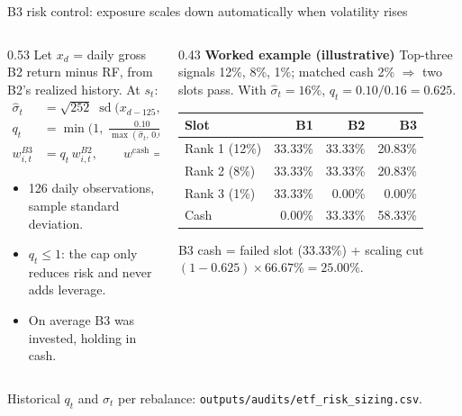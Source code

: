 \documentclass[aspectratio=169,11pt]{beamer}
\newcommand{\src}[1]{\par\vfill{\scriptsize\color{muted}\sloppy #1\par}\vskip0.05cm}
\begin{document}
\begin{frame}[t]{B3 risk control: exposure scales down automatically when volatility rises}
\begin{columns}[T,onlytextwidth]
\begin{column}{0.53\textwidth}
\small
Let $x_d$ = daily gross B2 return minus RF, from B2's realized history. At $s_t$:
\begin{align*}
\hat\sigma_t &= \sqrt{252}\;\operatorname{sd}\big(x_{d-125},\dots,x_{d}\big),\quad d=s_t,\\
q_t &= \min\!\Big(1,\;\frac{0.10}{\max(\hat\sigma_t,\,0.05)}\Big),\\
w^{B3}_{i,t} &= q_t\,w^{B2}_{i,t},\qquad w^{\text{cash}} = 1-q_t\textstyle\sum_i w^{B2}_{i,t}.
\end{align*}
\footnotesize
\begin{itemize}\itemsep2pt
\item 126 daily observations, sample standard deviation.
\item $q_t\le 1$: the cap only reduces risk and never adds leverage.
\item On average B3 was \BthreeInvested{} invested, holding \BthreeCash{} in cash.
\end{itemize}
\end{column}
\begin{column}{0.43\textwidth}
\footnotesize
\textbf{Worked example (illustrative)}
\vskip0.1cm
Top-three signals 12\%, 8\%, 1\%; matched cash 2\% $\Rightarrow$ two slots pass. With $\hat\sigma_t=16\%$, $q_t=0.10/0.16=0.625$.
\vskip0.15cm
\begin{tabular}{@{}lrrr@{}}
\toprule
Slot & B1 & B2 & B3 \\
\midrule
Rank 1 (12\%) & 33.33\% & 33.33\% & 20.83\% \\
Rank 2 (8\%) & 33.33\% & 33.33\% & 20.83\% \\
Rank 3 (1\%) & 33.33\% & 0.00\% & 0.00\% \\
\rowcolor{accentlight} Cash & 0.00\% & 33.33\% & 58.33\% \\
\bottomrule
\end{tabular}
\vskip0.12cm
B3 cash = failed slot (33.33\%) + scaling cut $(1-0.625)\times 66.67\%=25.00\%$.
\end{column}
\end{columns}
\src{Historical $q_t$ and $\hat\sigma_t$ per rebalance: \texttt{outputs/audits/etf\_risk\_sizing.csv}.}
\end{frame}
\end{document}
